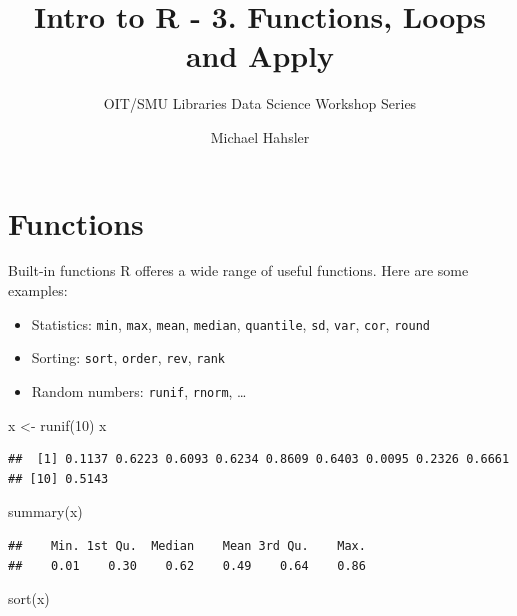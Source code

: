\documentclass[
  9pt,
  ignorenonframetext,
]{beamer}
\title{Intro to R - 3. Functions, Loops and Apply}
\subtitle{OIT/SMU Libraries Data Science Workshop Series}
\author{Michael Hahsler}
\date{}
\institute{OIT, SMU}
\newenvironment{Shaded}{\begin{snugshade}}{\end{snugshade}}
\newcommand{\DecValTok}[1]{\textcolor[rgb]{0.86,0.86,0.80}{#1}}
\newcommand{\KeywordTok}[1]{\textcolor[rgb]{0.94,0.87,0.69}{#1}}
\newcommand{\NormalTok}[1]{\textcolor[rgb]{0.80,0.80,0.80}{#1}}
\newcommand{\StringTok}[1]{\textcolor[rgb]{0.80,0.58,0.58}{#1}}
\providecommand{\tightlist}{%
  \setlength{\itemsep}{0pt}\setlength{\parskip}{0pt}}
\begin{document}
\frame{\titlepage}

\begin{frame}[allowframebreaks]
  \tableofcontents[hideallsubsections]
\end{frame}
\hypertarget{functions}{%
\section{Functions}\label{functions}}

\begin{frame}[fragile]{Built-in functions}
\protect\hypertarget{built-in-functions}{}
R offeres a wide range of useful functions. Here are some examples:

\begin{itemize}
\tightlist
\item
  Statistics: \texttt{min}, \texttt{max}, \texttt{mean},
  \texttt{median}, \texttt{quantile}, \texttt{sd}, \texttt{var},
  \texttt{cor}, \texttt{round}
\item
  Sorting: \texttt{sort}, \texttt{order}, \texttt{rev}, \texttt{rank}
\item
  Random numbers: \texttt{runif}, \texttt{rnorm}, \ldots{}
\end{itemize}

\small
\vfill

\begin{Shaded}
\begin{Highlighting}[]
\NormalTok{x \textless{}{-}}\StringTok{ }\KeywordTok{runif}\NormalTok{(}\DecValTok{10}\NormalTok{)}
\NormalTok{x}
\end{Highlighting}
\end{Shaded}

\begin{verbatim}
##  [1] 0.1137 0.6223 0.6093 0.6234 0.8609 0.6403 0.0095 0.2326 0.6661
## [10] 0.5143
\end{verbatim}

\begin{Shaded}
\begin{Highlighting}[]
\KeywordTok{summary}\NormalTok{(x)}
\end{Highlighting}
\end{Shaded}

\begin{verbatim}
##    Min. 1st Qu.  Median    Mean 3rd Qu.    Max. 
##    0.01    0.30    0.62    0.49    0.64    0.86
\end{verbatim}

\begin{Shaded}
\begin{Highlighting}[]
\KeywordTok{sort}\NormalTok{(x)}
\end{Highlighting}
\end{Shaded}


\end{frame}
\end{document}
